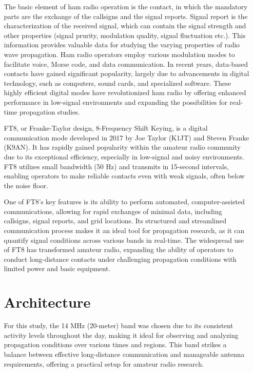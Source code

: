 \documentclass[conference]{IEEEtran}
\begin{document}
The basic element of ham radio operation is the contact, in which the mandatory
parts are the exchange of the callsigns and the signal reports. Signal report
is the characterization of the received signal, which can contain the signal strength
and other properties (signal prurity, modulation quality, signal fluctuation etc.).
This information provides valuable data for studying the varying properties of radio
wave propagation.
Ham radio operators employ various modulation modes to facilitate voice, Morse
code, and data communication. In recent years, data-based contacts have gained
significant popularity, largely due to advancements in digital technology, such
as computers, sound cards, and specialized software. These highly efficient
digital modes have revolutionized ham radio by offering enhanced performance in
low-signal environments and expanding the possibilities for real-time
propagation studies.

FT8, or Franke-Taylor design, 8-Frequency Shift Keying, is a digital
communication mode developed in 2017 by Joe Taylor (K1JT) and Steven Franke
(K9AN). It has rapidly gained popularity within the amateur radio community due
to its exceptional efficiency, especially in low-signal and noisy environments.
FT8 utilizes small bandwidth (50 Hz) and transmits in 15-second intervals,
enabling operators to make reliable contacts even with weak signals, often
below the noise floor.

One of FT8's key features is its ability to perform automated,
computer-assisted communications, allowing for rapid exchanges of minimal data,
including callsigns, signal reports, and grid locations. Its structured and
streamlined communication process makes it an ideal tool for propagation
research, as it can quantify signal conditions across various bands in
real-time. The widespread use of FT8 has transformed amateur radio, expanding
the ability of operators to conduct long-distance contacts under challenging
propagation conditions with limited power and basic equipment.

\cite{ga-vrp}

\section{Architecture}

For this study, the 14 MHz (20-meter) band was chosen due to its consistent
activity levels throughout the day, making it ideal for observing and analyzing
propagation conditions over various times and regions. This band strikes a
balance between effective long-distance communication and manageable antenna
requirements, offering a practical setup for amateur radio research.
\end{document}
